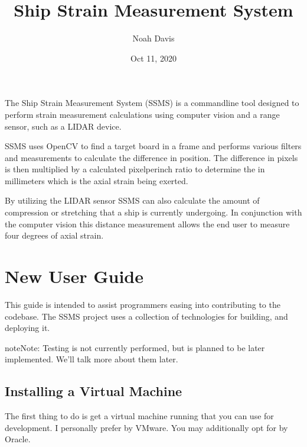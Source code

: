 \documentclass[letterpaper,10pt,english]{sphinxmanual}
\title{Ship Strain Measurement System}
\date{Oct 11, 2020}
\author{Noah Davis}
\begin{document}
\pagestyle{empty}
\sphinxmaketitle
\pagestyle{plain}
\sphinxtableofcontents
\pagestyle{normal}
\label{\detokenize{index::doc}}


The Ship Strain Measurement System (SSMS) is a command\sphinxhyphen{}line tool designed to perform strain measurement calculations
using computer vision and a range sensor, such as a LIDAR device.

SSMS uses OpenCV to find a target board in a frame and performs various filters and measurements to calculate the
difference in position. The difference in pixels  is then multiplied by a calculated pixel\sphinxhyphen{}per\sphinxhyphen{}inch ratio to
determine the  in millimeters which is the axial strain being exerted.

By utilizing the LIDAR sensor SSMS can also calculate the amount of compression or stretching that a ship is currently
undergoing. In conjunction with the computer vision this distance measurement allows the end user to measure four
degrees of axial strain.


\chapter{New User Guide}
\label{\detokenize{newuser:new-user-guide}}\label{\detokenize{newuser::doc}}
This guide is intended to assist programmers easing into contributing to the codebase. The SSMS project uses a
collection of technologies for building, and deploying it.

\begin{sphinxadmonition}{note}{Note:}
Testing is not currently performed, but is planned to be later implemented. We’ll talk more about them later.
\end{sphinxadmonition}


\section{Installing a Virtual Machine}
\label{\detokenize{newuser:installing-a-virtual-machine}}
The first thing to do is get a virtual machine running that you can use for development. I personally prefer
 by VMware. You may additionally opt for  by Oracle.
\end{document}
